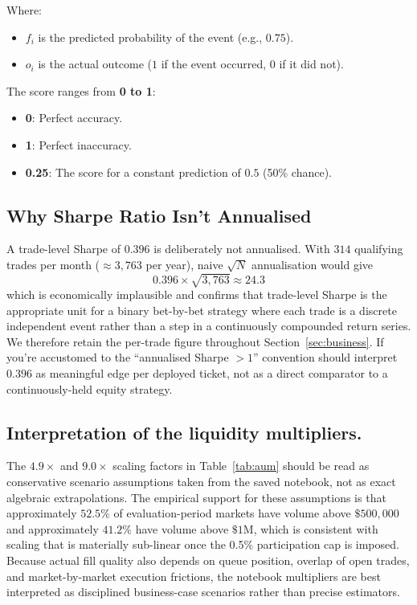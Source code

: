 \documentclass[11pt,a4paper]{article}
\newcommand{\edit}[1]{#1}
\begin{document}
Where:
\begin{itemize}[label=--]
    \item $f_i$ is the predicted probability of the event (e.g., $0.75$).
    \item $o_i$ is the actual outcome ($1$ if the event occurred, $0$ if it did not).
\end{itemize}

The score ranges from \textbf{0 to 1}:
\begin{itemize}[label=--]
    \item \textbf{0}: Perfect accuracy.
    \item \textbf{1}: Perfect inaccuracy.
    \item \textbf{0.25}: The score for a constant prediction of $0.5$ (50\% chance).
\end{itemize}

\subsection{\edit{Why Sharpe Ratio Isn't Annualised}}
\edit{A trade-level Sharpe of $0.396$ is deliberately not annualised. With
$314$ qualifying trades per month ($\approx 3{,}763$ per year), naive}
$\sqrt{N}$ annualisation would give
\[
0.396 \times \sqrt{3{,}763} \approx 24.3
\] 
\edit{which is economically implausible and confirms that trade-level Sharpe is the appropriate}
unit for a binary bet-by-bet strategy where each trade is a discrete
independent event rather than a step in a continuously compounded
return series. We therefore retain the per-trade figure throughout
Section~\ref{sec:business}. \edit{If you're accustomed to the}
``annualised Sharpe $>1$'' convention should interpret \edit{$0.396$} as
meaningful edge per deployed ticket, not as a direct comparator to a
continuously-held equity strategy.



\subsection{\edit{Interpretation of the liquidity multipliers.}}
\edit{The $4.9\times$ and $9.0\times$ scaling factors in Table~\ref{tab:aum} should be read as conservative scenario assumptions taken from the saved notebook, not as exact algebraic extrapolations. The empirical support for these assumptions is that approximately $52.5\%$ of evaluation-period markets have volume above $\$500{,}000$ and approximately $41.2\%$ have volume above $\$1\text{M}$, which is consistent with scaling that is materially sub-linear once the 0.5\% participation cap is imposed. Because actual fill quality also depends on queue position, overlap of open trades, and market-by-market execution frictions, the notebook multipliers are best interpreted as disciplined business-case scenarios rather than precise estimators.}
\end{document}
